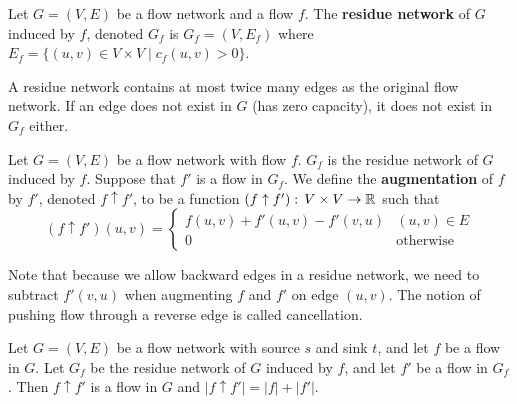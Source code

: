 \begin{definition} 
    Let $G=(V,E)$ be a flow network and a flow $f$. The \textbf{residue network} of $G$ induced by $f$, denoted $G_f$ is $G_f = (V,E_f)$ where $E_f = \{(u,v) \in V \times V \mid c_f(u,v) > 0 \}$.
\end{definition}
A residue network contains at most twice many edges as the original flow network. If an edge does not exist in $G$ (has zero capacity), it does not exist in $G_f$ either.

\begin{definition}[Augmentation] 
    Let $G=(V,E)$ be a flow network with flow $f$. $G_f$ is the residue network of $G$ induced by $f$. Suppose that $f'$ is a flow in $G_f$. We define the \textbf{augmentation} of $f$ by $f'$, denoted $f \uparrow f'$, to be a function $(f \uparrow f'):\, V\times V \to \mathbb{R}$ such that
    $$
    (f \uparrow f')(u,v) = \begin{cases}
        f(u,v) + f'(u,v) - f'(v,u) & (u,v) \in E \\
        0 & \text{otherwise}
    \end{cases}
    $$
\end{definition}

Note that because we allow backward edges in a residue network, we need to subtract $f'(v,u)$ when augmenting $f$ and $f'$ on edge $(u,v)$. The notion of pushing flow through a reverse edge is called cancellation.

\begin{lemma} \label{lem:value-of-augmented-flow}
    Let $G=(V,E)$ be a flow network with source $s$ and sink $t$, and let $f$ be a flow in $G$. Let $G_f$ be the residue network of $G$ induced by $f$, and let $f'$ be a flow in $G_f$. Then $f \uparrow f'$ is a flow in $G$ and $|f \uparrow f'| = |f| + |f'|$.
\end{lemma}

